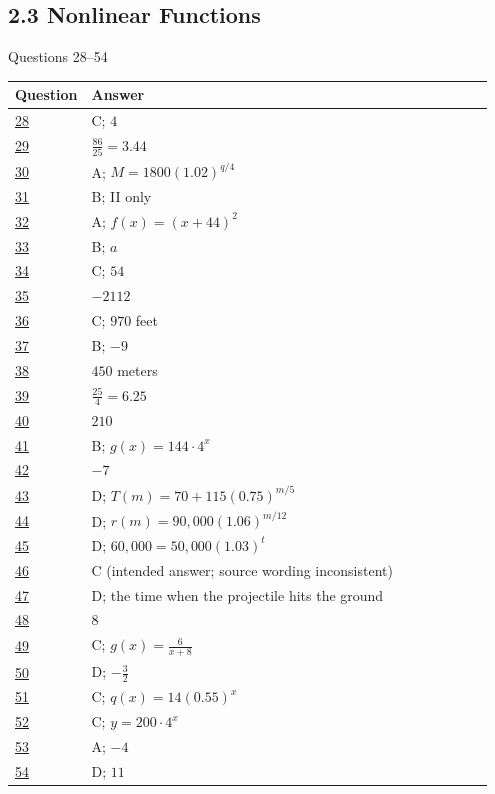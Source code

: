 \documentclass[11pt]{article}
\begin{document}
\subsection*{2.3 Nonlinear Functions}
{\small\color{NPgray}Questions 28--54}\par
\renewcommand{\arraystretch}{1.25}\begin{longtable}{@{}p{0.09\linewidth}p{0.86\linewidth}@{}}\toprule Question & Answer \\ \midrule\endhead
\hyperref[q91]{28} & C; $4$\\
\hyperref[q92]{29} & $\frac{86}{25}=3.44$\\
\hyperref[q93]{30} & A; $M=1800(1.02)^{q/4}$\\
\hyperref[q94]{31} & B; II only\\
\hyperref[q95]{32} & A; $f(x)=(x+44)^2$\\
\hyperref[q96]{33} & B; $a$\\
\hyperref[q97]{34} & C; $54$\\
\hyperref[q98]{35} & $-2112$\\
\hyperref[q99]{36} & C; $970$ feet\\
\hyperref[q100]{37} & B; $-9$\\
\hyperref[q101]{38} & $450$ meters\\
\hyperref[q102]{39} & $\frac{25}{4}=6.25$\\
\hyperref[q103]{40} & $210$\\
\hyperref[q104]{41} & B; $g(x)=144\cdot4^x$\\
\hyperref[q105]{42} & $-7$\\
\hyperref[q106]{43} & D; $T(m)=70+115(0.75)^{m/5}$\\
\hyperref[q107]{44} & D; $r(m)=90{,}000(1.06)^{m/12}$\\
\hyperref[q108]{45} & D; $60{,}000=50{,}000(1.03)^t$\\
\hyperref[q109]{46} & C (intended answer; source wording inconsistent)\\
\hyperref[q110]{47} & D; the time when the projectile hits the ground\\
\hyperref[q111]{48} & $8$\\
\hyperref[q112]{49} & C; $g(x)=\frac6{x+8}$\\
\hyperref[q113]{50} & D; $-\frac32$\\
\hyperref[q114]{51} & C; $q(x)=14(0.55)^x$\\
\hyperref[q115]{52} & C; $y=200\cdot4^x$\\
\hyperref[q116]{53} & A; $-4$\\
\hyperref[q117]{54} & D; $11$\\
\bottomrule\end{longtable}
\end{document}
